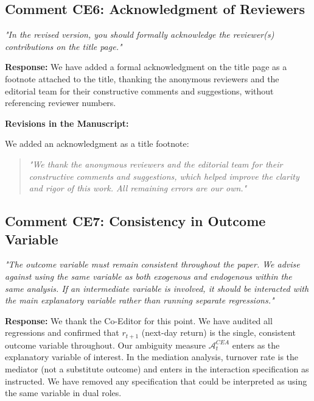 \documentclass[12pt]{article}
\begin{document}
\subsection*{Comment CE6: Acknowledgment of Reviewers}
\textit{"In the revised version, you should formally acknowledge the reviewer(s) contributions on the title page."}

\begin{highlightbox}
\textbf{Response:} We have added a formal acknowledgment on the title page as a footnote attached to the title, thanking the anonymous reviewers and the editorial team for their constructive comments and suggestions, without referencing reviewer numbers.
\end{highlightbox}

\begin{highlightbox}
\textbf{Revisions in the Manuscript:}

We added an acknowledgment as a title footnote:
\vspace{0.2cm}
\begin{quote}
\itshape "We thank the anonymous reviewers and the editorial team for their constructive comments and suggestions, which helped improve the clarity and rigor of this work. All remaining errors are our own."
\end{quote}
\end{highlightbox}

\subsection*{Comment CE7: Consistency in Outcome Variable}
\textit{"The outcome variable must remain consistent throughout the paper. We advise against using the same variable as both exogenous and endogenous within the same analysis. If an intermediate variable is involved, it should be interacted with the main explanatory variable rather than running separate regressions."}

\begin{highlightbox}
\textbf{Response:} We thank the Co-Editor for this point. We have audited all regressions and confirmed that $r_{t+1}$ (next-day return) is the single, consistent outcome variable throughout. Our ambiguity measure $\mathcal{A}^{CEA}_t$ enters as the explanatory variable of interest. In the mediation analysis, turnover rate is the mediator (not a substitute outcome) and enters in the interaction specification as instructed. We have removed any specification that could be interpreted as using the same variable in dual roles.
\end{highlightbox}
\end{document}
